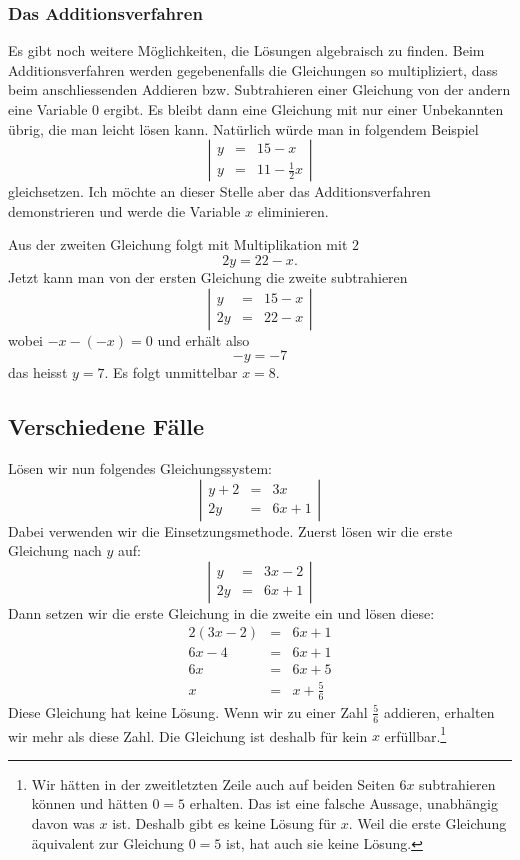 \documentclass[%
11pt,%
twoside,%
titlepage,%
german,%
]{scrartcl}
\newenvironment{system}{\begin{displaymath}
  \left| 
    \begin{array}{rcl}}{\end{array} \right| 
\end{displaymath}}
\begin{document}
\subsubsection{Das Additionsverfahren}

Es gibt noch weitere Möglichkeiten, die Lösungen algebraisch zu finden. Beim Additionsverfahren werden gegebenenfalls die Gleichungen so multipliziert, dass beim anschliessenden Addieren bzw. Subtrahieren einer Gleichung von der andern eine Variable $0$ ergibt. Es bleibt dann eine Gleichung mit nur einer Unbekannten übrig, die man leicht lösen kann. Natürlich würde man in folgendem Beispiel
\begin{system}
  y & = & 15-x \\
  y & = & 11-\frac{1}{2}x
\end{system}
gleichsetzen. Ich möchte an dieser Stelle aber das Additionsverfahren demonstrieren und werde die Variable $x$ eliminieren.

Aus der zweiten Gleichung folgt mit Multiplikation mit $2$
$$2y = 22 - x.$$
Jetzt kann man von der ersten Gleichung die zweite subtrahieren
\begin{system}
  y & = & 15-x \\
  2y & = & 22-x
\end{system}
wobei $-x-(-x)=0$ und erhält also
$$-y = -7$$
das heisst $y=7$. Es folgt unmittelbar $x=8$.


\subsection{Verschiedene F\"alle}
\label{linglsyst:faelle}

L\"osen wir nun folgendes Gleichungssystem:
\begin{system}
  y+2 & = & 3x \\
  2y & = & 6x+1
\end{system}Dabei verwenden wir die Einsetzungsmethode. Zuerst l\"osen wir die erste Gleichung nach $y$ auf:
\begin{system}
  y & = & 3x-2 \\
  2y & = & 6x+1
\end{system}Dann setzen wir die erste Gleichung in die zweite ein und l\"osen diese:
\begin{eqnarray*}
  2(3x-2) & = & 6x+1 \\
  6x-4 & = & 6x+1 \\
  6x & = & 6x + 5 \\
  x & = & x + \frac{5}{6}
\end{eqnarray*}
Diese Gleichung hat keine L\"osung. Wenn wir zu einer Zahl $\frac{5}{6}$ addieren, erhalten wir mehr als diese Zahl. Die Gleichung ist deshalb f\"ur kein $x$ erf\"ullbar.\footnote{Wir h\"atten in der zweitletzten Zeile auch auf beiden Seiten $6x$ subtrahieren k\"onnen und h\"atten $0=5$ erhalten. Das ist eine falsche Aussage, unabh\"angig davon was $x$ ist. Deshalb gibt es keine L\"osung f\"ur $x$. Weil die erste Gleichung \"aquivalent zur Gleichung $0=5$ ist, hat auch sie keine L\"osung.}
\end{document}
